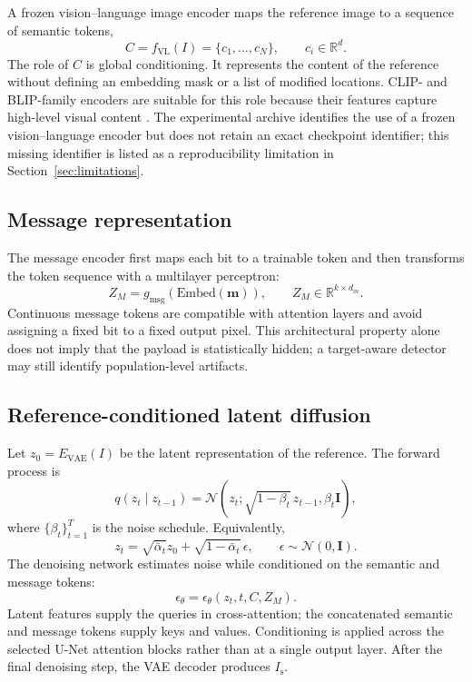 \documentclass[pdflatex,sn-mathphys-num]{sn-jnl}
\newcommand{\stego}{I_{\mathrm{s}}}
\newcommand{\msg}{\mathbf{m}}
\begin{document}
A frozen vision--language image encoder maps the reference image to a sequence of semantic tokens,
\begin{equation}
C=f_{\mathrm{VL}}(I)=\{c_1,\ldots,c_N\}, \qquad c_i\in\mathbb{R}^{d}.
\label{eq:semantic}
\end{equation}
The role of $C$ is global conditioning. It represents the content of the reference without defining an embedding mask or a list of modified locations. CLIP- and BLIP-family encoders are suitable for this role because their features capture high-level visual content \cite{radford2021learning,li2022blip,li2023blip2}. The experimental archive identifies the use of a frozen vision--language encoder but does not retain an exact checkpoint identifier; this missing identifier is listed as a reproducibility limitation in Section~\ref{sec:limitations}.

\subsection{Message representation}

The message encoder first maps each bit to a trainable token and then transforms the token sequence with a multilayer perceptron:
\begin{equation}
Z_M=g_{\mathrm{msg}}(\mathrm{Embed}(\msg)), \qquad Z_M\in\mathbb{R}^{k\times d_m}.
\label{eq:message}
\end{equation}
Continuous message tokens are compatible with attention layers and avoid assigning a fixed bit to a fixed output pixel. This architectural property alone does not imply that the payload is statistically hidden; a target-aware detector may still identify population-level artifacts.

\subsection{Reference-conditioned latent diffusion}

Let $z_0=E_{\mathrm{VAE}}(I)$ be the latent representation of the reference. The forward process is
\begin{equation}
q(z_t\mid z_{t-1})=
\mathcal{N}\!\left(z_t;\sqrt{1-\beta_t}\,z_{t-1},\beta_t\mathbf{I}\right),
\label{eq:forward}
\end{equation}
where $\{\beta_t\}_{t=1}^{T}$ is the noise schedule. Equivalently,
\begin{equation}
z_t=\sqrt{\bar{\alpha}_t}z_0+\sqrt{1-\bar{\alpha}_t}\,\epsilon,
\qquad \epsilon\sim\mathcal{N}(0,\mathbf{I}).
\label{eq:closedforward}
\end{equation}
The denoising network estimates noise while conditioned on the semantic and message tokens:
\begin{equation}
\epsilon_{\theta}=\epsilon_{\theta}(z_t,t,C,Z_M).
\label{eq:denoiser}
\end{equation}
Latent features supply the queries in cross-attention; the concatenated semantic and message tokens supply keys and values. Conditioning is applied across the selected U-Net attention blocks rather than at a single output layer. After the final denoising step, the VAE decoder produces $\stego$.
\end{document}
